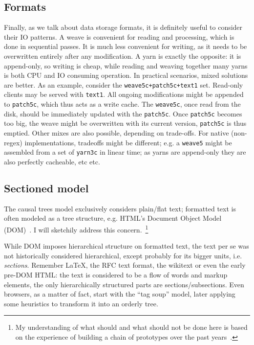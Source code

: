 \documentclass{acm_proc_article-sp}
\begin{document}
\subsection{Formats}

Finally, as we talk about data storage formats, it is
definitely useful to consider their IO patterns. A weave
is convenient for reading and processing, which is done in
sequential passes. It is much less convenient for writing,
as it needs to be overwritten entirely after any
modification. A yarn is exactly the opposite: it is
append-only, so writing is cheap, while reading and
weaving together many yarns is both CPU and IO
consuming operation.
In practical scenarios, mixed solutions are better.
As an example, consider the {\tt weave5c+patch5c+text1} set.
Read-only clients may be served with {\tt text1}. All
ongoing modifications might be appended to {\tt patch5c},
which thus acts as a write cache. The {\tt weave5c}, once
read from the disk, should be immediately  updated with
the {\tt patch5c}. Once {\tt patch5c} becomes too
big, the weave might be overwritten with its current
version, {\tt patch5c} is thus emptied. Other mixes are
also possible, depending on trade-offs. For native (non-regex)
implementations, tradeoffs might be different; e.g.
a {\tt weave5} might be assembled from a set of {\tt yarn3c}
in linear time; as yarns are append-only they are also
perfectly cacheable, etc etc.


\subsection{Sectioned model}

The causal trees model exclusively considers plain/flat text;
formatted text is often modeled as a tree structure, e.g.
HTML's Document Object Model (DOM)~\cite{dom}. I will sketchily
address this concern.~\footnote{My understanding of what should
and what should not be done here is based on the experience of
building a chain of prototypes over the past 
years~\cite{www06,csr07,wikisym08}.} 

While DOM imposes hierarchical structure on formatted text,
the text per se was not historically considered hierarchical,
except probably for its bigger units, i.e. \emph{sections}. 
Remember LaTeX, the RFC text format, the wikitext or even the
early pre-DOM HTML: the text is considered to be a flow of
words and markup elements, the only hierarchically structured
parts are sections/subsections. Even browsers, as a matter of fact,
start with the ``tag soup'' model, later applying some
heuristics to transform it into an orderly tree. 
\end{document}
